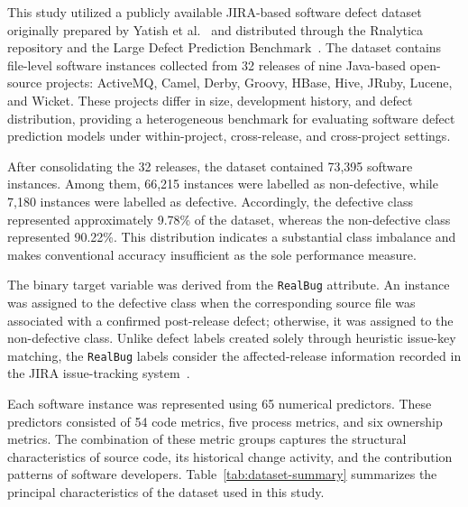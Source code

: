 \documentclass[conference]{IEEEtran}
\begin{document}
\label{subsec:dataset-description}

This study utilized a publicly available JIRA-based software defect
dataset originally prepared by Yatish et al.~\cite{yatish2019} and
distributed through the Rnalytica repository and the Large Defect
Prediction Benchmark~\cite{tantithamthavorn2022benchmark}. The dataset
contains file-level software instances collected from 32 releases of
nine Java-based open-source projects: ActiveMQ, Camel, Derby, Groovy,
HBase, Hive, JRuby, Lucene, and Wicket. These projects differ in size,
development history, and defect distribution, providing a heterogeneous
benchmark for evaluating software defect prediction models under
within-project, cross-release, and cross-project settings.

After consolidating the 32 releases, the dataset contained 73,395
software instances. Among them, 66,215 instances were labelled as
non-defective, while 7,180 instances were labelled as defective.
Accordingly, the defective class represented approximately 9.78\% of
the dataset, whereas the non-defective class represented 90.22\%.
This distribution indicates a substantial class imbalance and makes
conventional accuracy insufficient as the sole performance measure.

The binary target variable was derived from the \texttt{RealBug}
attribute. An instance was assigned to the defective class when the
corresponding source file was associated with a confirmed post-release
defect; otherwise, it was assigned to the non-defective class. Unlike
defect labels created solely through heuristic issue-key matching, the
\texttt{RealBug} labels consider the affected-release information
recorded in the JIRA issue-tracking system~\cite{yatish2019}.

Each software instance was represented using 65 numerical predictors.
These predictors consisted of 54 code metrics, five process metrics,
and six ownership metrics. The combination of these metric groups
captures the structural characteristics of source code, its historical
change activity, and the contribution patterns of software developers.
Table~\ref{tab:dataset-summary} summarizes the principal characteristics
of the dataset used in this study.
\end{document}
